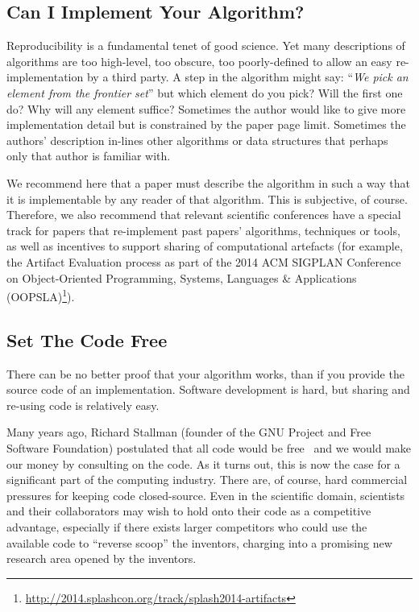 \documentclass[a4paper,11pt]{article}
\begin{document}
\subsection{Can I Implement Your Algorithm?}

Reproducibility is a fundamental tenet of good science. Yet many
descriptions of algorithms are too high-level, too obscure, too
poorly-defined to allow an easy re-implementation by a third party. A
step in the algorithm might say: ``{\emph{We pick an element from the
frontier set}}'' but which element do you pick? Will the first one do?
Why will any element suffice? Sometimes the author would like to give
more implementation detail but is constrained by the paper page
limit. Sometimes the authors' description in-lines other algorithms or
data structures that perhaps only that author is familiar with.

 We recommend here
that a paper must describe the algorithm in such a way that it is
implementable by any reader of that algorithm. This is subjective, of
course. Therefore, we also recommend that relevant scientific
conferences have a special track for papers that re-implement past
papers' algorithms, techniques or tools, as well as incentives to
support sharing of computational artefacts (for example, the Artifact
Evaluation process as part of the 2014 ACM SIGPLAN Conference on
Object-Oriented Programming, Systems, Languages \&
Applications (OOPSLA)\footnote{\url{http://2014.splashcon.org/track/splash2014-artifacts}}).


\subsection{Set The Code Free} 

There can be no better proof that your algorithm works, than if you
provide the source code of an implementation. Software development is
hard, but sharing and re-using code is relatively easy.

Many years ago, Richard Stallman (founder of the GNU Project and Free
Software Foundation) postulated that all code would be
free~\cite{rms:2010} and we would make our money by consulting on the
code.  As it turns out, this is now the case for a significant
part of the computing industry. There are, of course, hard commercial
pressures for keeping code closed-source. Even in the scientific
domain, scientists and their collaborators may wish to hold onto their
code as a competitive advantage, especially if there exists larger
competitors who could use the available code to ``reverse scoop'' the
inventors, charging into a promising new research area opened by the
inventors.
\end{document}
